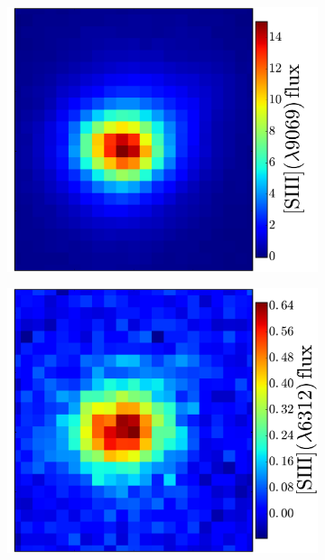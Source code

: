 \documentclass[traditabstract]{aa}
\begin{document}
\begin{figure}
\begin{subfigure}{.24\textwidth}
\includegraphics[width=0.999\linewidth]{Figs/MUSE_SN1998bw_SIIIzoom.pdf}
\end{subfigure}
\begin{subfigure}{.24\textwidth}
\includegraphics[width=0.999\linewidth]{Figs/MUSE_SN1998bw_SIIIauzoom.pdf}
\end{subfigure}
\begin{subfigure}{.24\textwidth}

\end{subfigure}
\end{figure}
\end{document}
